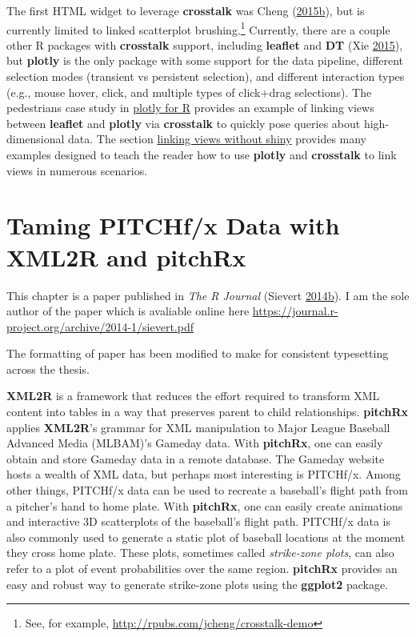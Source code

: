 \documentclass[12pt,]{isuthesis}
\let\rmarkdownfootnote\footnote%
\def\footnote{\protect\rmarkdownfootnote}
\begin{document}
The first HTML widget to leverage \textbf{crosstalk} was Cheng
(\protect\hyperlink{ref-d3scatter}{2015}\protect\hyperlink{ref-d3scatter}{b}),
but is currently limited to linked scatterplot brushing.\footnote{See,
  for example, \url{http://rpubs.com/jcheng/crosstalk-demo}} Currently,
there are a couple other R packages with \textbf{crosstalk} support,
including \textbf{leaflet} and \textbf{DT} (Xie
\protect\hyperlink{ref-DT}{2015}), but \textbf{plotly} is the only
package with some support for the data pipeline, different selection
modes (transient vs persistent selection), and different interaction
types (e.g., mouse hover, click, and multiple types of click+drag
selections). The pedestrians case study in
\protect\hyperlink{plotly-for-R}{plotly for R} provides an example of
linking views between \textbf{leaflet} and \textbf{plotly} via
\textbf{crosstalk} to quickly pose queries about high-dimensional data.
The section \protect\hyperlink{linking-views-without-shiny}{linking
views without shiny} provides many examples designed to teach the reader
how to use \textbf{plotly} and \textbf{crosstalk} to link views in
numerous scenarios.

\chapter{Taming PITCHf/x Data with XML2R and pitchRx}

This chapter is a paper published in \emph{The R Journal} (Sievert
\protect\hyperlink{ref-Sievert:2014a}{2014}\protect\hyperlink{ref-Sievert:2014a}{b}).
I am the sole author of the paper which is avaliable online here
\url{https://journal.r-project.org/archive/2014-1/sievert.pdf}

The formatting of paper has been modified to make for consistent
typesetting across the thesis.


\textbf{XML2R} is a framework that reduces the effort required to
transform XML content into tables in a way that preserves parent to
child relationships. \textbf{pitchRx} applies \textbf{XML2R}'s grammar
for XML manipulation to Major League Baseball Advanced Media (MLBAM)'s
Gameday data. With \textbf{pitchRx}, one can easily obtain and store
Gameday data in a remote database. The Gameday website hosts a wealth of
XML data, but perhaps most interesting is PITCHf/x. Among other things,
PITCHf/x data can be used to recreate a baseball's flight path from a
pitcher's hand to home plate. With \textbf{pitchRx}, one can easily
create animations and interactive 3D scatterplots of the baseball's
flight path. PITCHf/x data is also commonly used to generate a static
plot of baseball locations at the moment they cross home plate. These
plots, sometimes called \textit{strike-zone plots}, can also refer to a
plot of event probabilities over the same region. \textbf{pitchRx}
provides an easy and robust way to generate strike-zone plots using the
\textbf{ggplot2} package.
\end{document}
